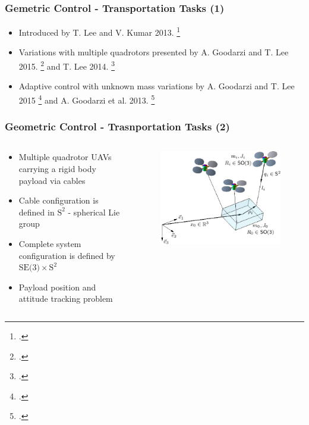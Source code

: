 \begin{frame}
	\frametitle{Gemetric Control - Transportation Tasks (1)}
	
	\begin{itemize}
		\item Introduced by T. Lee and V. Kumar 2013. \footcite{cable-load1}
		\item Variations with multiple quadrotors presented by A. Goodarzi and T. Lee 2015. \footcite{cable-load-multiple} and T. Lee 2014. \footcite{Lee2014GeometricCO}
		\item Adaptive control with unknown mass variations by A. Goodarzi and T. Lee 2015 \footcite{flexible-cable-dynamics} and A. Goodarzi et al. 2013. \footcite{stabilization-flexible-cable}
	\end{itemize}
\end{frame}

\begin{frame}
	\frametitle{Geometric Control - Trasnportation Tasks (2)}
	
	\begin{columns}
		\begin{column}{0.5\textwidth}\centering
			\begin{itemize}
				\item Multiple quadrotor UAVs carrying a rigid body payload via cables
				\item Cable configuration is defined in $\text{S}^2$ - spherical Lie group
				\item Complete system configuration is defined by $\text{SE(3)} \times \text{S}^2$
				\item Payload position and attitude tracking problem
			\end{itemize}
		\end{column}
		
		\begin{column}{0.5\textwidth}\centering
			\begin{figure}[H]
				\includegraphics[width=\columnwidth]{figures/payload_carrying.png}	
				\centering
			\end{figure}
		\end{column}
	\end{columns}
		
\end{frame}